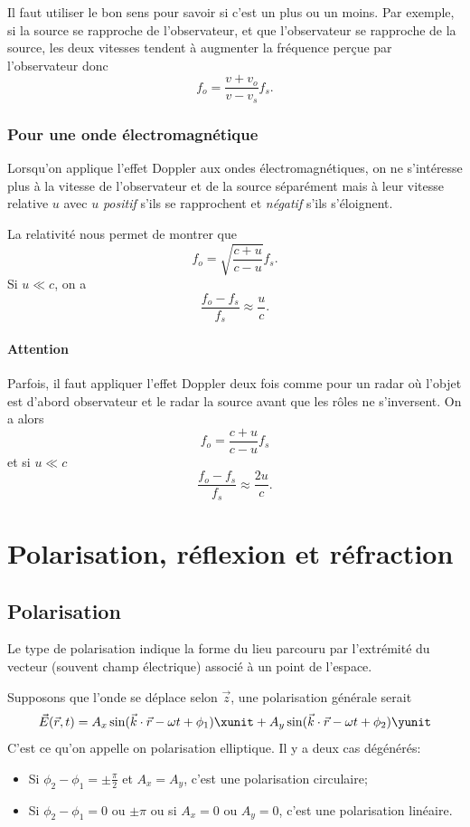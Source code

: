 Il faut utiliser le bon sens pour savoir si c'est un plus ou un moins.
Par exemple, si la source se rapproche de l'observateur, et que
l'observateur se rapproche de la source, les deux vitesses
tendent à augmenter la fréquence perçue par l'observateur donc
\[ f_o = \frac{v + v_o}{v - v_s} f_s. \]

\subsubsection{Pour une onde électromagnétique}
Lorsqu'on applique l'effet Doppler aux ondes électromagnétiques,
on ne s'intéresse plus à la vitesse de l'observateur et de la source séparément
mais à leur vitesse relative $u$ avec $u$ \emph{positif} s'ils se rapprochent
et \emph{négatif} s'ils s'éloignent.

La relativité nous permet de montrer que
\[ f_o = \sqrt{\frac{c + u}{c - u}}f_s. \]
Si $u \ll c$, on a
\[ \frac{f_o - f_s}{f_s} \approx \frac{u}{c}. \]

\paragraph{Attention} Parfois, il faut appliquer l'effet Doppler deux fois
comme pour un radar où l'objet est d'abord observateur et le radar la source
avant que les rôles ne s'inversent.
On a alors
\[ f_o = \frac{c + u}{c - u}f_s \]
et si $u \ll c$
\[ \frac{f_o - f_s}{f_s} \approx \frac{2u}{c}. \]

\section{Polarisation, réflexion et réfraction}

\subsection{Polarisation}
Le type de polarisation indique la forme du lieu parcouru
par l'extrémité du vecteur (souvent champ électrique) associé à un
point de l'espace.

Supposons que l'onde se déplace selon $\vec{z}$,
une polarisation générale serait
\[ \vec{E}(\vec{r}, t) = A_x \sin(\vec{k}\cdot\vec{r} - \omega t + \phi_1)
  \xunit
+ A_y \sin(\vec{k} \cdot \vec{r} - \omega t + \phi_2) \yunit \]
C'est ce qu'on appelle on polarisation elliptique.
Il y a deux cas dégénérés:
\begin{itemize}
  \item Si $\phi_2-\phi_1 = \pm \frac{\pi}{2}$
    et $A_x = A_y$, c'est une polarisation circulaire;
  \item Si $\phi_2-\phi_1 = 0$ ou $\pm\pi$ ou si $A_x = 0$ ou $A_y = 0$,
    c'est une polarisation linéaire.
\end{itemize}

